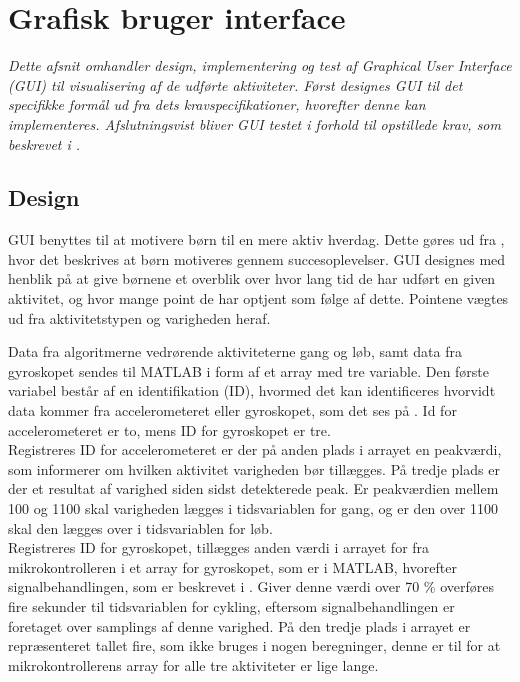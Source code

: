 \section{Grafisk bruger interface}\label{GUI_design}
\textit{Dette afsnit omhandler design, implementering og test af Graphical User Interface (GUI) til visualisering af de udførte aktiviteter. Først designes GUI til det specifikke formål ud fra dets kravspecifikationer, hvorefter denne kan implementeres. Afslutningsvist bliver GUI testet i forhold til opstillede krav, som beskrevet i .}

\subsection{Design}
GUI benyttes til at motivere børn til en mere aktiv hverdag. Dette gøres ud fra , hvor det beskrives at børn motiveres gennem succesoplevelser. GUI designes med henblik på at give børnene et overblik over hvor lang tid de har udført en given aktivitet, og hvor mange point de har optjent som følge af dette. Pointene vægtes ud fra aktivitetstypen og varigheden heraf. 

Data fra algoritmerne vedrørende aktiviteterne gang og løb, samt data fra gyroskopet sendes til MATLAB i form af et array med tre variable. Den første variabel består af en identifikation (ID), hvormed det kan identificeres hvorvidt data kommer fra accelerometeret eller gyroskopet, som det ses på . Id for accelerometeret er to, mens ID for gyroskopet er tre.\\
Registreres ID for accelerometeret er der på anden plads i arrayet en peakværdi, som informerer om hvilken aktivitet varigheden bør tillægges. På tredje plads er der et resultat af varighed siden sidst detekterede peak. Er peakværdien mellem 100 og 1100 skal varigheden lægges i tidsvariablen for gang, og er den over 1100 skal den lægges over i tidsvariablen for løb.\\
Registreres ID for gyroskopet, tillægges anden værdi i arrayet for fra mikrokontrolleren i et array for gyroskopet, som er i MATLAB, hvorefter signalbehandlingen, som er beskrevet i . Giver denne værdi over 70 \% overføres fire sekunder til tidsvariablen for cykling, eftersom signalbehandlingen er foretaget over samplings af denne varighed. På den tredje plads i arrayet er repræsenteret tallet fire, som ikke bruges i nogen beregninger, denne er til for at mikrokontrollerens array for alle tre aktiviteter er lige lange. 

